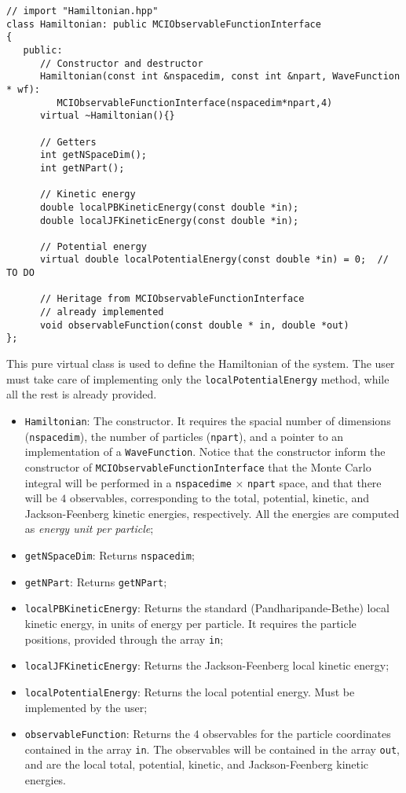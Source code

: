 \documentclass[11pt,a4paper,twoside]{article}
\begin{document}
\begin{lstlisting}
// import "Hamiltonian.hpp"
class Hamiltonian: public MCIObservableFunctionInterface
{
   public:
      // Constructor and destructor
      Hamiltonian(const int &nspacedim, const int &npart, WaveFunction * wf):     
         MCIObservableFunctionInterface(nspacedim*npart,4)
      virtual ~Hamiltonian(){}

      // Getters
      int getNSpaceDim();
      int getNPart();
      
      // Kinetic energy
      double localPBKineticEnergy(const double *in);
      double localJFKineticEnergy(const double *in);
      
      // Potential energy
      virtual double localPotentialEnergy(const double *in) = 0;  // TO DO
      
      // Heritage from MCIObservableFunctionInterface
      // already implemented
      void observableFunction(const double * in, double *out)
};
\end{lstlisting}

This pure virtual class is used to define the Hamiltonian of the system.
The user must take care of implementing only the \verb+localPotentialEnergy+ method, while all the rest is already provided.

\begin{itemize}
   \item \verb+Hamiltonian+: The constructor. It requires the spacial number of dimensions (\verb+nspacedim+), the number of particles (\verb+npart+), and a pointer to an implementation of a \verb+WaveFunction+. Notice that the constructor inform the constructor of \verb+MCIObservableFunctionInterface+ that the Monte Carlo integral will be performed in a \verb+nspacedime+ $\times$ \verb+npart+ space, and that there will be $4$ observables, corresponding to the total, potential, kinetic, and Jackson-Feenberg kinetic energies, respectively. All the energies are computed as \emph{energy unit per particle};
   \item \verb+getNSpaceDim+: Returns \verb+nspacedim+;
   \item \verb+getNPart+: Returns \verb+getNPart+;
   \item \verb+localPBKineticEnergy+: Returns the standard (Pandharipande-Bethe) local kinetic energy, in units of energy per particle. It requires the particle positions, provided through the array \verb+in+;
   \item \verb+localJFKineticEnergy+: Returns the Jackson-Feenberg local kinetic energy;
   \item \verb+localPotentialEnergy+: Returns the local potential energy. Must be implemented by the user;
   \item \verb+observableFunction+: Returns the $4$ observables for the particle coordinates contained in the array \verb+in+. The observables will be contained in the array \verb+out+, and are the local total, potential, kinetic, and Jackson-Feenberg kinetic energies.
\end{itemize}
\end{document}
